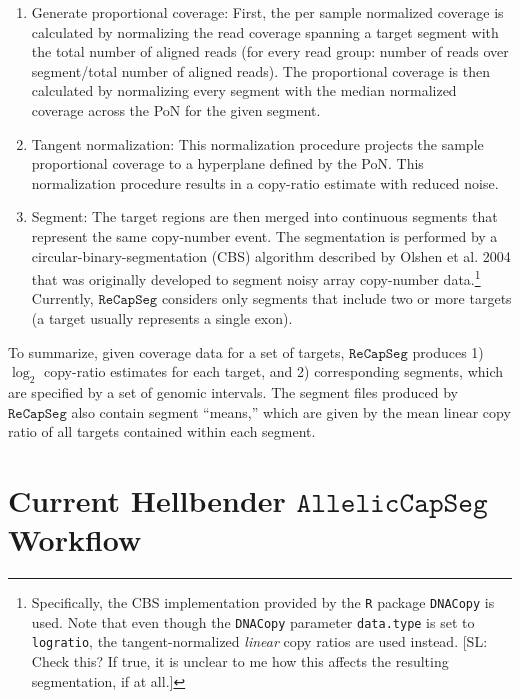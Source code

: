 \documentclass[nofootinbib,amssymb,amsmath]{revtex4}
\newcommand{\RCS}{\texttt{ReCapSeg}}
\newcommand{\ACS}{\texttt{AllelicCapSeg}}
\def\SL#1{{\color [rgb]{0,0,0.8} [SL: #1]}}
\begin{document}
\begin{enumerate}
\item
Generate proportional coverage: First, the per sample normalized coverage is calculated by normalizing the read coverage spanning a
target segment with the total number of aligned reads (for every read group: number of reads over segment/total number of aligned reads).  The proportional coverage is then calculated by normalizing every segment with the median normalized coverage across the PoN for the given segment.
\item
Tangent normalization: This normalization procedure projects the sample proportional coverage to a hyperplane defined by the PoN. This normalization procedure results in a copy-ratio estimate with reduced noise.
\item
Segment: The target regions are then merged into continuous segments that represent the same copy-number event. The segmentation is performed by a circular-binary-segmentation (CBS) algorithm described by Olshen et al. 2004 that was originally developed to segment noisy array copy-number data.\footnote{Specifically, the CBS implementation provided by the \texttt{R} package \texttt{DNACopy} is used. Note that even though the \texttt{DNACopy} parameter \texttt{data.type} is set to \texttt{logratio}, the tangent-normalized \emph{linear} copy ratios are used instead.  \SL{Check this?  If true, it is unclear to me how this affects the resulting segmentation, if at all.}} Currently, $\RCS$ considers only segments that include two or more targets (a target usually represents a single exon).
\end{enumerate}

To summarize, given coverage data for a set of targets, $\RCS$ produces 1) $\log_2$ copy-ratio estimates for each target, and 2) corresponding segments, which are specified by a set of genomic intervals.  The segment files produced by $\RCS$ also contain segment ``means,'' which are given by the mean linear copy ratio of all targets contained within each segment.

\section{Current Hellbender $\ACS$ Workflow} \label{current-alleliccapseg-workflow}
\end{document}
